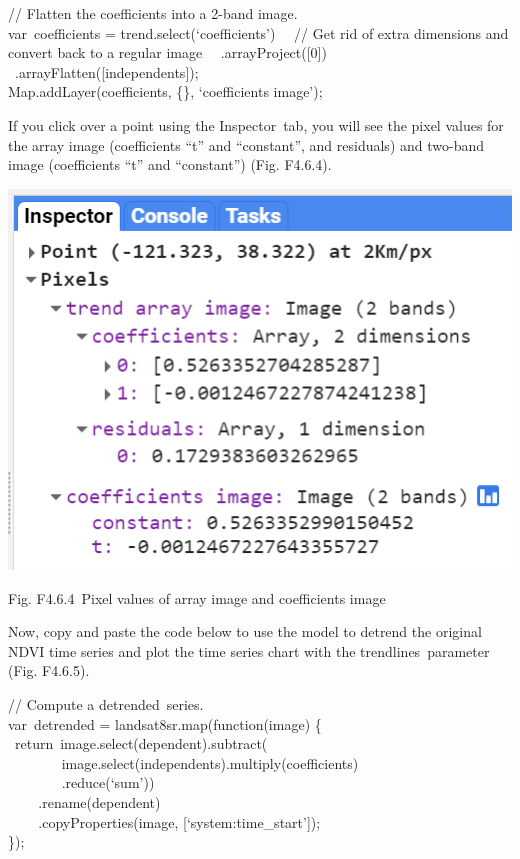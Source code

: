 \documentclass[
  letterpaper,
  DIV=11,
  numbers=noendperiod]{scrreprt}
\begin{document}
// Flatten the coefficients into a 2-band image.\\
var~coefficients = trend.select(`coefficients')~ ~// Get rid of extra
dimensions and convert back to a regular image~
~.arrayProject({[}0{]})\\
\hspace*{0.333em} ~.arrayFlatten({[}independents{]});\\
Map.addLayer(coefficients, \{\}, `coefficients image');

If you click over a point using the Inspector~tab, you will see the
pixel values for the array image (coefficients ``t'' and ``constant'',
and residuals) and two-band image (coefficients ``t'' and ``constant'')
(Fig. F4.6.4).

\includegraphics{./F4/image53.png}

Fig. F4.6.4~Pixel values of array image and coefficients image

Now, copy and paste the code below to use the model to detrend the
original NDVI time series and plot the time series chart with the
trendlines~parameter (Fig. F4.6.5).

// Compute a detrended~series.\\
var~detrended = landsat8sr.map(function(image) \{~
~return~image.select(dependent).subtract(\\
\hspace*{0.333em} ~ ~ ~ ~
~image.select(independents).multiply(coefficients)\\
\hspace*{0.333em} ~ ~ ~ ~ ~.reduce(`sum'))\\
\hspace*{0.333em} ~ ~ ~.rename(dependent)\\
\hspace*{0.333em} ~ ~ ~.copyProperties(image,
{[}`system:time\_start'{]});\\
\});
\end{document}

